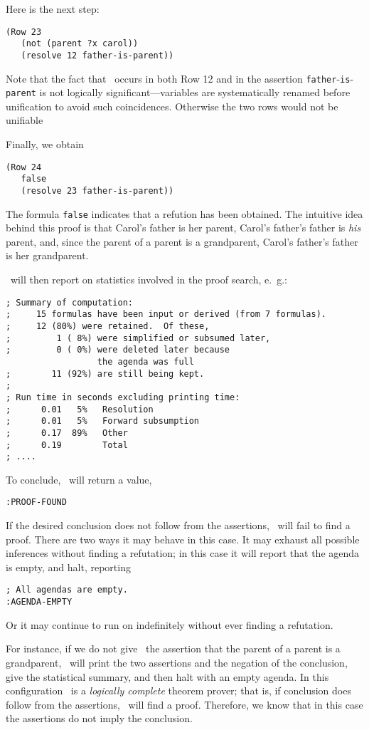 Here is the next step:
\begin{verbatim}
(Row 23
   (not (parent ?x carol))
   (resolve 12 father-is-parent))
\end{verbatim}
Note that the fact that \varx\  occurs in both Row 12 and in the
assertion {\tt father}-{\tt is}-{\tt parent} is not logically
significant---variables are systematically renamed before unification
to avoid such coincidences.  Otherwise the two rows would not be
unifiable

Finally, we obtain
\begin{verbatim}
(Row 24
   false
   (resolve 23 father-is-parent))
\end{verbatim}
The formula {\tt false} indicates that a refution has been obtained.
The intuitive idea behind this proof is that Carol's father is her
parent, Carol's father's father is {\em his} parent, and, since the
parent of a parent is a grandparent, Carol's father's father is her
grandparent.

\Snark\  will then report on statistics involved in the proof search,
e.\  g.:
\begin{verbatim}
; Summary of computation:
;     15 formulas have been input or derived (from 7 formulas).
;     12 (80%) were retained.  Of these,
;         1 ( 8%) were simplified or subsumed later,
;         0 ( 0%) were deleted later because
                  the agenda was full
;        11 (92%) are still being kept.
;
; Run time in seconds excluding printing time:
;      0.01   5%   Resolution
;      0.01   5%   Forward subsumption
;      0.17  89%   Other
;      0.19        Total
; ....
\end{verbatim}
To conclude, \snark\  will return a value,
\begin{verbatim}
:PROOF-FOUND
\end{verbatim}

If the desired conclusion does not follow from the assertions, \Snark\
will fail to find a proof. There are two ways it may behave in this
case.  It may exhaust all possible inferences without finding a
refutation; in this case it will report that the agenda is empty, and
halt, reporting
\begin{verbatim}
; All agendas are empty.
:AGENDA-EMPTY
\end{verbatim}
Or it may continue to run on indefinitely without ever finding
a refutation.

For instance, if we do not give \Snark\  the assertion that the parent of a
parent is a grandparent, \Snark\  will print the two assertions and the
negation of the conclusion, give the statistical summary, and then
halt with an empty agenda.
In this configuration \snark\  is a {\em logically complete} theorem
prover; that is, if conclusion does follow from the assertions,
\snark\  will find a proof.  Therefore, we know that in this case the
assertions do not imply the conclusion.


